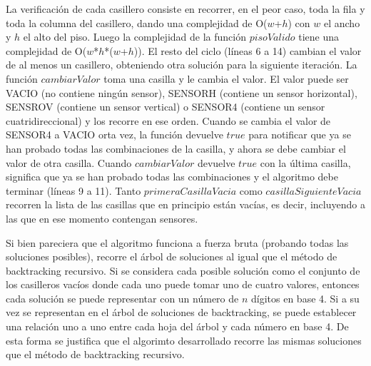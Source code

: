 \par{La verificaci\'on de cada casillero consiste en recorrer, en el peor caso, toda la fila y toda la columna del casillero, dando una complejidad de O($w$+$h$) con $w$ el ancho y $h$ el alto del piso. Luego la complejidad de la funci\'on $pisoValido$ tiene una complejidad de O($w$*$h$*($w$+$h$)). El resto del ciclo (l\'ineas 6 a 14) cambian el valor de al menos un casillero, obteniendo otra soluci\'on para la siguiente iteraci\'on. La funci\'on $cambiarValor$ toma una casilla y le cambia el valor. El valor puede ser VACIO (no contiene ning\'un sensor), SENSORH (contiene un sensor horizontal), SENSROV (contiene un sensor vertical) o SENSOR4 (contiene un sensor cuatridireccional) y los recorre en ese orden. Cuando se cambia el valor de SENSOR4 a VACIO orta vez, la funci\'on devuelve $true$ para notificar que ya se han probado todas las combinaciones de la casilla, y ahora se debe cambiar el valor de otra casilla. Cuando $cambiarValor$ devuelve $true$ con la \'ultima casilla, significa que ya se han probado todas las combinaciones y el algoritmo debe terminar (l\'ineas 9 a 11). Tanto $primeraCasillaVacia$ como $casillaSiguienteVacia$ recorren la lista de las casillas que en principio est\'an vac\'ias, es decir, incluyendo a las que en ese momento contengan sensores.}
\medskip
\par{Si bien pareciera que el algoritmo funciona a fuerza bruta (probando todas las soluciones posibles), recorre el \'arbol de soluciones al igual que el m\'etodo de backtracking recursivo. Si se considera cada posible soluci\'on como el conjunto de los casilleros vac\'ios donde cada uno puede tomar uno de cuatro valores, entonces cada soluci\'on se puede representar con un n\'umero de $n$ d\'igitos en base 4. Si a su vez se representan en el \'arbol de soluciones de backtracking, se puede establecer una relaci\'on uno a uno entre cada hoja del \'arbol y cada n\'umero en base 4. De esta forma se justifica que el algorimto desarrollado recorre las mismas soluciones que el m\'etodo de backtracking recursivo.}

